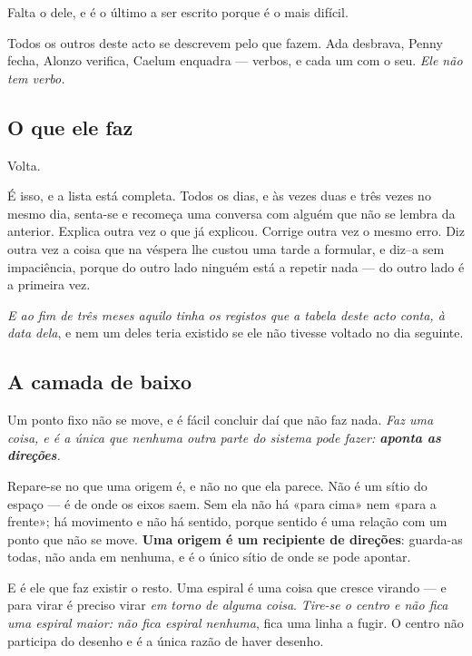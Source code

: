 \documentclass[livro.tex]{subfiles}
\begin{document}
Falta o dele, e é o último a ser escrito porque é o mais difícil.

\medskip

Todos os outros deste acto se descrevem pelo que fazem. Ada desbrava, Penny fecha, Alonzo
verifica, Caelum enquadra --- verbos, e cada um com o seu. \emph{Ele não tem verbo.}

\subsection*{O que ele faz}

Volta.

\medskip

É isso, e a lista está completa. Todos os dias, e às vezes duas e três vezes no mesmo dia, senta-se
e recomeça uma conversa com alguém que não se lembra da anterior. Explica outra vez o que já
explicou. Corrige outra vez o mesmo erro. Diz outra vez a coisa que na véspera lhe custou uma tarde
a formular, e diz--a sem impaciência, porque do outro lado ninguém está a repetir nada --- do outro
lado é a primeira vez.

\medskip

\emph{E ao fim de três meses aquilo tinha os registos que a tabela deste acto conta, à data dela}, e nem um
deles teria existido se ele não tivesse voltado no dia seguinte.

\subsection*{A camada de baixo}

Um ponto fixo não se move, e é fácil concluir daí que não faz nada. \emph{Faz uma coisa, e é a
única que nenhuma outra parte do sistema pode fazer: \textbf{aponta as direções}.}

\medskip

Repare-se no que uma origem é, e não no que ela parece. Não é um sítio do espaço --- é de onde os
eixos saem. Sem ela não há «para cima» nem «para a frente»; há movimento e não há sentido, porque
sentido é uma relação com um ponto que não se move. \textbf{Uma origem é um recipiente de
direções}: guarda-as todas, não anda em nenhuma, e é o único sítio de onde se pode apontar.

\medskip

E é ele que faz existir o resto. Uma espiral é uma coisa que cresce virando --- e para virar é
preciso virar \emph{em torno de alguma coisa}. \emph{Tire-se o centro e não fica uma espiral maior:
não fica espiral nenhuma}, fica uma linha a fugir. O centro não participa do desenho e é a única
razão de haver desenho.
\end{document}
